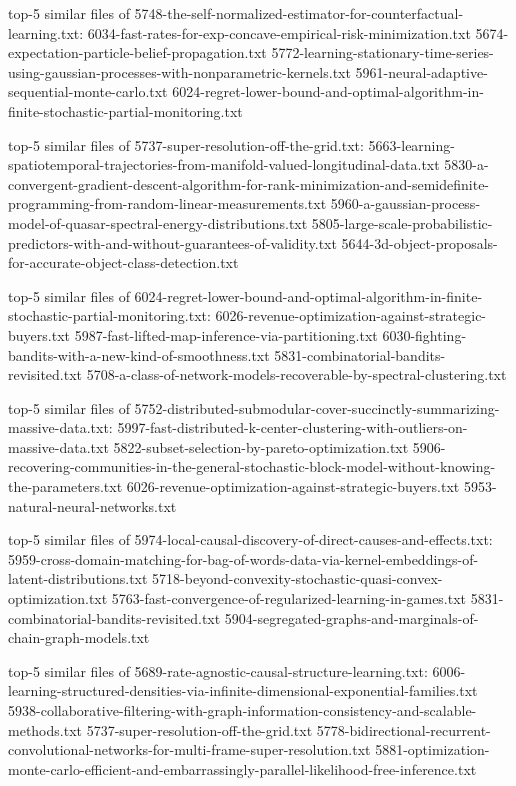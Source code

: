 \documentclass[11pt]{article}
\begin{document}
top-5 similar files of
5748-the-self-normalized-estimator-for-counterfactual-learning.txt:
6034-fast-rates-for-exp-concave-empirical-risk-minimization.txt
5674-expectation-particle-belief-propagation.txt
5772-learning-stationary-time-series-using-gaussian-processes-with-nonparametric-kernels.txt
5961-neural-adaptive-sequential-monte-carlo.txt
6024-regret-lower-bound-and-optimal-algorithm-in-finite-stochastic-partial-monitoring.txt

top-5 similar files of 5737-super-resolution-off-the-grid.txt:
5663-learning-spatiotemporal-trajectories-from-manifold-valued-longitudinal-data.txt
5830-a-convergent-gradient-descent-algorithm-for-rank-minimization-and-semidefinite-programming-from-random-linear-measurements.txt
5960-a-gaussian-process-model-of-quasar-spectral-energy-distributions.txt
5805-large-scale-probabilistic-predictors-with-and-without-guarantees-of-validity.txt
5644-3d-object-proposals-for-accurate-object-class-detection.txt

top-5 similar files of
6024-regret-lower-bound-and-optimal-algorithm-in-finite-stochastic-partial-monitoring.txt:
6026-revenue-optimization-against-strategic-buyers.txt
5987-fast-lifted-map-inference-via-partitioning.txt
6030-fighting-bandits-with-a-new-kind-of-smoothness.txt
5831-combinatorial-bandits-revisited.txt
5708-a-class-of-network-models-recoverable-by-spectral-clustering.txt

top-5 similar files of
5752-distributed-submodular-cover-succinctly-summarizing-massive-data.txt:
5997-fast-distributed-k-center-clustering-with-outliers-on-massive-data.txt
5822-subset-selection-by-pareto-optimization.txt
5906-recovering-communities-in-the-general-stochastic-block-model-without-knowing-the-parameters.txt
6026-revenue-optimization-against-strategic-buyers.txt
5953-natural-neural-networks.txt

top-5 similar files of
5974-local-causal-discovery-of-direct-causes-and-effects.txt:
5959-cross-domain-matching-for-bag-of-words-data-via-kernel-embeddings-of-latent-distributions.txt
5718-beyond-convexity-stochastic-quasi-convex-optimization.txt
5763-fast-convergence-of-regularized-learning-in-games.txt
5831-combinatorial-bandits-revisited.txt
5904-segregated-graphs-and-marginals-of-chain-graph-models.txt

top-5 similar files of 5689-rate-agnostic-causal-structure-learning.txt:
6006-learning-structured-densities-via-infinite-dimensional-exponential-families.txt
5938-collaborative-filtering-with-graph-information-consistency-and-scalable-methods.txt
5737-super-resolution-off-the-grid.txt
5778-bidirectional-recurrent-convolutional-networks-for-multi-frame-super-resolution.txt
5881-optimization-monte-carlo-efficient-and-embarrassingly-parallel-likelihood-free-inference.txt
\end{document}
